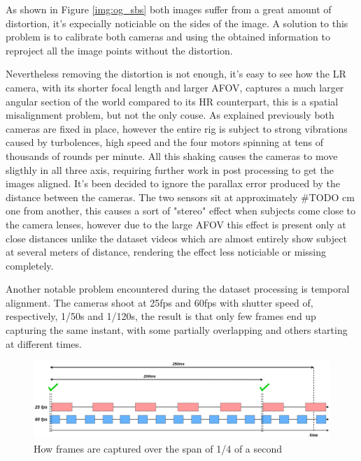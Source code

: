 As shown in Figure \ref{img:og_sbs} both images suffer from a great amount of distortion, it's expecially noticiable on the sides of the image. A solution to this problem is to calibrate both cameras and using the obtained information to reproject all the image points without the distortion.

Nevertheless removing the distortion is not enough, it's easy to see how the LR camera, with its shorter focal length and larger AFOV, captures a much larger angular section of the world compared to its HR counterpart, this is a spatial misalignment problem, but not the only couse. As explained previously both cameras are fixed in place, however the entire rig is subject to strong vibrations caused by turbolences, high speed and the four motors spinning at tens of thousands of rounds per minute. All this shaking causes the cameras to move sligthly in all three axis, requiring further work in post processing to get the images aligned.
It's been decided to ignore the parallax error produced by the distance between the cameras. The two sensors sit at approximately \#TODO cm one from another, this causes a sort of "stereo" effect when subjects come close to the camera lenses, however due to the large AFOV this effect is present only at close distances unlike the dataset videos which are almost entirely show subject at several meters of distance, rendering the effect less noticiable or missing completely.\newline

Another notable problem encountered during the dataset processing is temporal alignment. The cameras shoot at 25fps and 60fps with shutter speed of, respectively, 1/50s and 1/120s, the result is that only few frames end up capturing the same instant, with some partially overlapping and others starting at different times.

\begin{figure}[h]
  \centering
  \includegraphics[scale=0.22]{figures/temporal_align_3.png}
  \caption{How frames are captured over the span of 1/4 of a second}
  \label{img:temp_align}
\end{figure}

